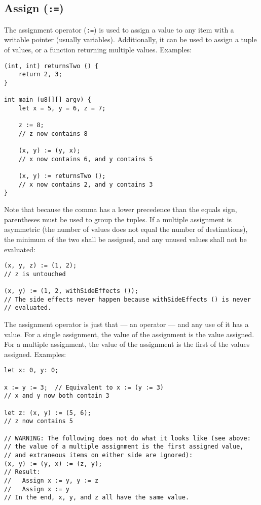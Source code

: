 \documentclass{article}
\begin{document}
\subsection{Assign (\texttt{:=})}
\label{sub:operators:assign}
The assignment operator (\texttt{:=}) is used to assign a value to any item with
a writable pointer (usually variables). Additionally, it can be used to assign
a tuple of values, or a function returning multiple values.
Examples:
\begin{verbatim}
(int, int) returnsTwo () {
    return 2, 3;
}

int main (u8[][] argv) {
    let x = 5, y = 6, z = 7;

    z := 8;
    // z now contains 8

    (x, y) := (y, x);
    // x now contains 6, and y contains 5

    (x, y) := returnsTwo ();
    // x now contains 2, and y contains 3
}
\end{verbatim}

Note that because the comma has a lower precedence than the equals sign,
parentheses must be used to group the tuples. If a multiple assignment is
asymmetric (the number of values does not equal the number of destinations),
the minimum of the two shall be assigned, and any unused values shall not be
evaluated:
\begin{verbatim}
(x, y, z) := (1, 2);
// z is untouched

(x, y) := (1, 2, withSideEffects ());
// The side effects never happen because withSideEffects () is never
// evaluated.
\end{verbatim}

The assignment operator is just that --- an operator --- and any use of it has
a value. For a single assignment, the value of the assignment is the value
assigned. For a multiple assignment, the value of the assignment is the first
of the values assigned. Examples:
\begin{verbatim}
let x: 0, y: 0;

x := y := 3;  // Equivalent to x := (y := 3)
// x and y now both contain 3

let z: (x, y) := (5, 6);
// z now contains 5

// WARNING: The following does not do what it looks like (see above:
// the value of a multiple assignment is the first assigned value,
// and extraneous items on either side are ignored):
(x, y) := (y, x) := (z, y);
// Result:
//   Assign x := y, y := z
//   Assign x := y
// In the end, x, y, and z all have the same value.
\end{verbatim}
\end{document}

